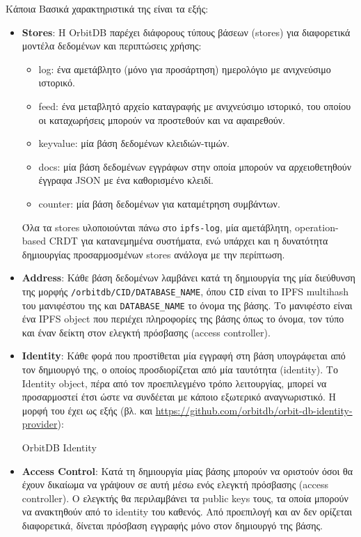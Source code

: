 Κάποια Βασικά χαρακτηριστικά της είναι τα εξής:
\begin{itemize}
	\item \textbf{Stores}: Η OrbitDB παρέχει διάφορους τύπους βάσεων (stores) για διαφορετικά μοντέλα δεδομένων και περιπτώσεις χρήσης:
	
	\begin{itemize}
		\item log: ένα αμετάβλητο (μόνο για προσάρτηση) ημερολόγιο με ανιχνεύσιμο ιστορικό.
		\item feed: ένα μεταβλητό αρχείο καταγραφής με ανιχνεύσιμο ιστορικό, του οποίου οι καταχωρήσεις μπορούν να προστεθούν και να αφαιρεθούν.
		\item keyvalue: μία βάση δεδομένων κλειδιών-τιμών.
		\item docs: μία βάση δεδομένων εγγράφων στην οποία μπορούν να αρχειοθετηθούν έγγραφα JSON με ένα καθορισμένο κλειδί.
		\item counter: μία βάση δεδομένων για καταμέτρηση συμβάντων.
	\end{itemize}
	
	Όλα τα stores υλοποιούνται πάνω στο \texttt{ipfs-log}, μία αμετάβλητη, operation-based CRDT για κατανεμημένα συστήματα, ενώ υπάρχει και η δυνατότητα δημιουργίας προσαρμοσμένων stores ανάλογα με την περίπτωση.
	
	\item \textbf{Address}: Κάθε βάση δεδομένων λαμβάνει κατά τη δημιουργία της μία διεύθυνση της μορφής \texttt{/orbitdb/CID/DATABASE\_NAME}, όπου \texttt{CID} είναι το IPFS multihash του μανιφέστου της και \texttt{DATABASE\_NAME} το όνομα της βάσης.\cite{2.8-orbitdb-guide} Το μανιφέστο είναι ένα IPFS object που περιέχει πληροφορίες της βάσης όπως το όνομα, τον τύπο και έναν δείκτη στον ελεγκτή πρόσβασης (access controller).
	
	\item \textbf{Identity}: Κάθε φορά που προστίθεται μία εγγραφή στη βάση υπογράφεται από τον δημιουργό της, ο οποίος προσδιορίζεται από μία ταυτότητα (identity). Το Identity object, πέρα από τον προεπιλεγμένο τρόπο λειτουργίας, μπορεί να προσαρμοστεί έτσι ώστε να συνδέεται με κάποιο εξωτερικό αναγνωριστικό.
	Η μορφή του έχει ως εξής (βλ. και  \url{https://github.com/orbitdb/orbit-db-identity-provider}):
	
	\begin{enumitemcenteredfigure}
		\caption{OrbitDB Identity}
	\end{enumitemcenteredfigure}

	\item \textbf{Access Control}: Κατά τη δημιουργία μίας βάσης μπορούν να οριστούν όσοι θα έχουν δικαίωμα να γράψουν σε αυτή μέσω ενός ελεγκτή πρόσβασης (access controller). Ο ελεγκτής θα περιλαμβάνει τα public keys τους, τα οποία μπορούν να ανακτηθούν από το identity του καθενός. Από προεπιλογή και αν δεν ορίζεται διαφορετικά, δίνεται πρόσβαση εγγραφής μόνο στον δημιουργό της βάσης.
\end{itemize}
